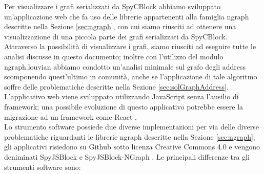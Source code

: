 Per visualizzare i grafi serializzati da SpyCBlock abbiamo sviluppato un'applicazione web che fa uso delle librerie appartenenti alla famiglia ngraph descritte nella Sezione \ref{sec:ngraph}, con cui siamo riusciti ad ottenere una visualizzazione di una piccola parte dei grafi serializzati da SpyCBlock.\\
Attraverso la possibilità di visualizzare i grafi, siamo riusciti ad eseguire tutte le analisi discusse in questo documento; inoltre con l'utilizzo del modulo ngraph.louvian abbiamo condotto un'analisi minimale sul grafo degli address scomponendo quest'ultimo in comunità, anche se l'applicazione di tale algoritmo soffre delle problematiche descritte nella Sezione \ref{sec:solGraphAddress}.\\
L'applicativo web viene sviluppato utilizzando JavaScript senza l'ausilio di framework; una possibile evoluzione di questo applicativo potrebbe essere la migrazione ad un framework come React \cite{vis:react}.\\
Lo strumento software possiede due diverse implementazioni per via delle diverse problematiche riguardanti le librerie ngraph descritte nella Sezione \ref{sec:ngraph}; gli applicativi risiedono su Github sotto licenza Creative Commons 4.0 e vengono deniminati SpyJSBlock \cite{vis:SpyJSBlock} e SpyJSBlock-NGraph \cite{vis:SpyJSBlock-Ngraph}.
Le principali differenze tra gli strumenti software sono:
